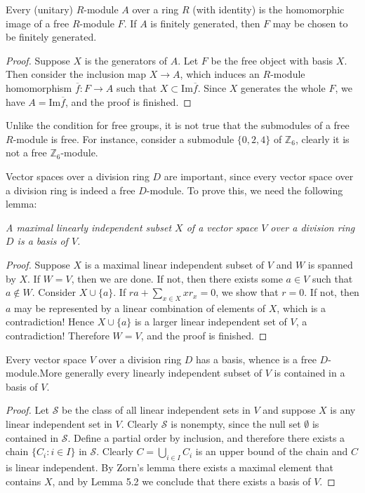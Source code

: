 \begin{corollary}
Every (unitary) $R$-module $A$ over a ring $R$ (with identity) is the homomorphic image of a free $R$-module $F$. If $A$ is finitely generated, then $F$ may be chosen to be finitely generated.
\end{corollary}
\begin{proof}
Suppose $X$ is the generators of $A$. Let $F$ be the free object with basis $X$. Then consider the inclusion map $X\to A$, which induces an $R$-module homomorphism $\overline{f}:F\to A$ such that $X\subset\mathrm{Im}\overline{f}$. Since $X$ generates the whole $F$, we have $A=\mathrm{Im}\overline{f}$, and the proof is finished.
\end{proof}
Unlike the condition for free groups, it is not true that the submodules of a free $R$-module is free. For instance, consider a submodule $\{0,2,4\}$ of $\mathbb{Z}_6$, clearly it is not a free $\mathbb{Z}_6$-module.\par
Vector spaces over a division ring $D$ are important, since every vector space over a division ring is indeed a free $D$-module. To prove this, we need the following lemma: 
\begin{lemma}\em
A maximal linearly independent subset $X$ of a vector space $V$ over a division ring $D$ is a basis of $V$.
\end{lemma}
\begin{proof}
Suppose $X$ is a maximal linear independent subset of $V$ and $W$ is spanned by $X$. If $W=V$, then we are done. If not, then there exists some $a\in V$ such that $a\notin W$. Consider $X\cup\{a\}$. If $ra+\sum_{x\in X}xr_x=0$, we show that $r=0$. If not, then $a$ may be represented by a linear combination of elements of $X$, which is a contradiction! Hence $X\cup\{a\}$ is a larger linear independent set of $V$, a contradiction! Therefore $W=V$, and the proof is finished.
\end{proof}
\begin{theorem}
Every vector space $V$ over a division ring $D$ has a basis, whence is a free $D$-module.More generally every linearly independent subset of $V$ is contained in 
a basis of $V$.
\end{theorem}
\begin{proof}
Let $\mathcal{S}$ be the class of all linear independent sets in $V$ and suppose $X$ is any linear independent set in $V$. Clearly $\mathcal{S}$ is nonempty, since the null set $\emptyset$ is contained in $\mathcal{S}$. Define a partial order by inclusion, and therefore there exists a chain $\{C_i:i\in I\}$ in $\mathcal{S}$. Clearly $C=\bigcup_{i\in I} C_i$ is an upper bound of the chain and $C$ is linear independent. By Zorn's lemma there exists a maximal element that contains $X$, and by Lemma 5.2 we conclude that there exists a basis of $V$.
\end{proof}

